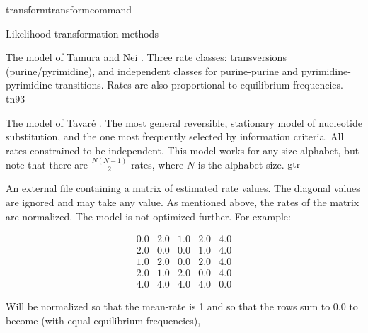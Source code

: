 \begin{command}{transform}{transformcommand}
\begin{arguments}
\begin{argumentgroup}{Likelihood transformation methods}
{\begin{description}
                        {The model of Tamura and Nei \cite{tamura1993}. Three
                        rate classes: transversions (purine/pyrimidine), and
                        independent classes for purine-purine and
                        pyrimidine-pyrimidine transitions. Rates are also
                        proportional to equilibrium frequencies.}
                        {tn93}

                        {The model of Tavar\'{e} \cite{tavare1986}. The most general
                        reversible, stationary model of nucleotide substitution,
                        and the one most frequently selected by information
                        criteria. All rates constrained to be independent. This
                        model works for any size alphabet, but note that there
                        are $\frac{N (N-1)}{2}$ rates, where $N$ is the alphabet
                        size.}
                        {gtr}

                        {An external file containing a matrix of estimated rate
                        values. The diagonal values are ignored and may take any
                        value. As mentioned above, the rates of the matrix are
                        normalized. The model is not optimized further. For example:
 
                        \begin{equation*}
                            \begin{array}{ccccc}
                                0.0 & 2.0 & 1.0 & 2.0 & 4.0 \\
                                2.0 & 0.0 & 0.0 & 1.0 & 4.0 \\
                                1.0 & 2.0 & 0.0 & 2.0 & 4.0 \\
                                2.0 & 1.0 & 2.0 & 0.0 & 4.0 \\
                                4.0 & 4.0 & 4.0 & 4.0 & 0.0
                             \end{array}
                        \end{equation*} 

                        Will be normalized so that the mean-rate is 1 and so
                        that the rows sum to 0.0 to become (with equal equilibrium
                        frequencies),

}
\end{description}}
\end{argumentgroup}
\end{arguments}
\end{command}
